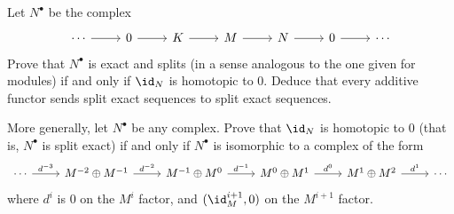 \begin{exercise}\label{split exact iff}
Let $N^\bullet$ be the complex
\[\begin{tikzcd}
\cdots\ar[r]&0\ar[r]&K\ar[r]&M\ar[r]&N\ar[r]&0\ar[r]&\cdots
\end{tikzcd}\]
Prove that $N^\bullet$ is exact and splits (in a sense analogous to the one given for modules) if and only if $\id_N$ is homotopic to $0$. Deduce that every additive functor sends split exact sequences to split exact sequences.\par
More generally, let $N^\bullet$ be any complex. Prove that $\id_N$ is homotopic to $0$ (that is, $N^\bullet$ is split exact) if and only if $N^\bullet$ is isomorphic to a complex of the form
\[\begin{tikzcd}
\cdots\ar[r,"d^{-3}"]&M^{-2}\oplus M^{-1}\ar[r,"d^{-2}"]&M^{-1}\oplus M^{0}\ar[r,"d^{-1}"]&M^0\oplus M^1\ar[r,"d^0"]&M^1\oplus M^2\ar[r,"d^1"]&\cdots
\end{tikzcd}\]
where $d^i$ is $0$ on the $M^i$ factor, and $(\id_M^{i+1},0)$ on the $M^{i+1}$ factor.
\end{exercise}
